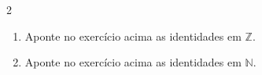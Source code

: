 \documentclass[a4paper,14pt]{article}
\begin{document}
\begin{multicols}{2}
\begin{enumerate}
\begin{enumerate}[a)]
    				\item $x = -x$ \\\\\\\\\\
    				\item $-2 < -x$ \\\\\\\\\\
    				\item $-x > 0$ \\\\\\\\\\
    				\item $-4 = x$ \\\\\\\\
    				\item $-x = -x$ \\\\\\\\\\
    				\item $x \leq x$ \\\\\\\\\\
    				\item $x > -x$ \\\\\\\\\\\\
    				\item $x \leq -x$ \\\\\\\\\\
    				\item $x = -(-x)$ \\\\\\\\
    				\item $0 > -x$ \\\\\\\\
    			\end{enumerate}
    		\item Aponte no exercício acima as identidades em $\mathbb{Z}$.
    		\item Aponte no exercício acima as identidades em $\mathbb{N}$.


\end{enumerate}
\end{multicols}
\end{document}
